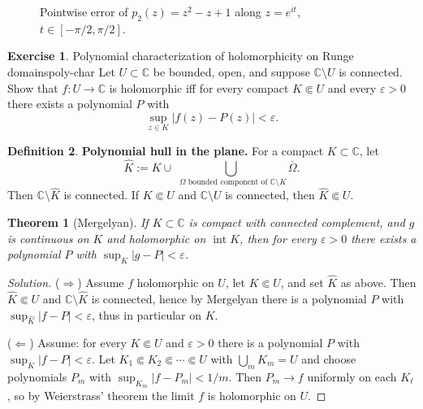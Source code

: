\documentclass[11pt,a4paper]{article}
\newtheorem{theorem}{Theorem}
\theoremstyle{definition}
\newtheorem{exercise}{Exercise} %
\theoremstyle{definition}
\newtheorem{definition}[exercise]{Definition}
\theoremstyle{plain}
\theoremstyle{remark}
\begin{document}
\begin{figure}[H]
	\centering
	\caption{Pointwise error of $p_2(z)=z^2-z+1$ along $z=e^{it}$, $t\in[-\pi/2,\pi/2]$.}
\end{figure}

\begin{exercise}{Polynomial characterization of holomorphicity on Runge domains}{poly-char}
	Let $U\subset\mathbb C$ be bounded, open, and suppose $\mathbb C\setminus U$ is connected.
	Show that $f:U\to\mathbb C$ is holomorphic iff for every compact $K\Subset U$ and every
	$\varepsilon>0$ there exists a polynomial $P$ with
	\[
	\sup_{z\in K}|f(z)-P(z)|<\varepsilon.
	\]
\end{exercise}

\begin{definition}
	\textbf{Polynomial hull in the plane.} For a compact $K\subset\mathbb C$, let
	\[
	\widehat K:=K\cup\!\!\!\bigcup_{\ \ \Omega\text{ bounded component of }\mathbb C\setminus K}\!\!\!\!\overline{\Omega}.
	\]
	Then $\mathbb C\setminus\widehat K$ is connected. If $K\Subset U$ and $\mathbb C\setminus U$ is connected,
	then $\widehat K\Subset U$.
\end{definition}

\begin{theorem}[Mergelyan]
	If $K\subset\mathbb C$ is compact with connected complement, and $g$ is continuous on $K$
	and holomorphic on $\operatorname{int}K$, then for every $\varepsilon>0$ there exists a polynomial
	$P$ with $\sup_{K}|g-P|<\varepsilon$.
\end{theorem}

\begin{proof}[Solution]
	($\Rightarrow$) Assume $f$ holomorphic on $U$, let $K\Subset U$, and set $\widehat K$ as above.
	Then $\widehat K\Subset U$ and $\mathbb C\setminus\widehat K$ is connected, hence by Mergelyan
	there is a polynomial $P$ with $\sup_{\widehat K}|f-P|<\varepsilon$, thus in particular on $K$.
	
	($\Leftarrow$) Assume: for every $K\Subset U$ and $\varepsilon>0$ there is a polynomial
	$P$ with $\sup_K|f-P|<\varepsilon$. Let $K_1\Subset K_2\Subset\cdots\Subset U$ with
	$\bigcup_m K_m=U$ and choose polynomials $P_m$ with $\sup_{K_m}|f-P_m|<1/m$.
	Then $P_m\to f$ uniformly on each $K_\ell$, so by Weierstrass’ theorem the limit $f$
	is holomorphic on $U$.
\end{proof}
\end{document}
